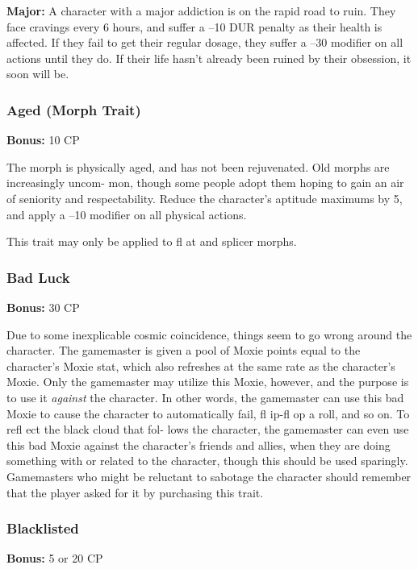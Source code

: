 \textbf{Major:} A character with a major addiction is on 
the rapid road to ruin. They face cravings every 6 
hours, and suffer a –10 DUR penalty as their health 
is affected. If they fail to get their regular dosage, they 
suffer a –30 modifier on all actions until they do. If 
their life hasn't already been ruined by their obsession, 
it soon will be.

\subsubsection{Aged (Morph Trait)}

\textbf{Bonus:} 10 CP

The morph is physically aged, and has not been 
rejuvenated. Old morphs are increasingly uncom-
mon, though some people adopt them hoping to 
gain an air of seniority and respectability. Reduce 
the character's aptitude maximums by 5, and apply 
a –10 modifier on all physical actions.

This trait may only be applied to fl at and splicer 
morphs.

\subsubsection{Bad Luck}

\textbf{Bonus:} 30 CP

Due to some inexplicable cosmic coincidence, 
things seem to go wrong around the character. The 
gamemaster is given a pool of Moxie points equal 
to the character's Moxie stat, which also refreshes 
at the same rate as the character's Moxie. Only the 
gamemaster may utilize this Moxie, however, and 
the purpose is to use it \textit{against} the character. In other 
words, the gamemaster can use this bad Moxie to 
cause the character to automatically fail, fl ip-fl op a 
roll, and so on. To refl ect the black cloud that fol-
lows the character, the gamemaster can even use this 
bad Moxie against the character's friends and allies, 
when they are doing something with or related to 
the character, though this should be used sparingly. 
Gamemasters who might be reluctant to sabotage the 
character should remember that the player asked for 
it by purchasing this trait.

\subsubsection{Blacklisted}

\textbf{Bonus:} 5 or 20 CP

